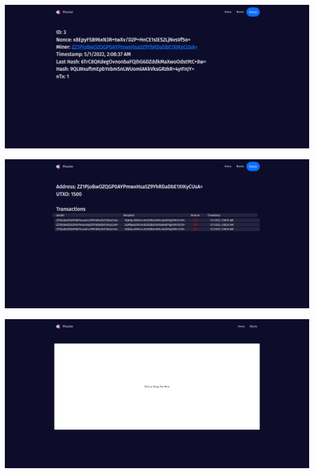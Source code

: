 \documentclass[../documentation.tex]{subfiles}
\begin{document}

\includegraphics[width=\textwidth]{images/website3}


\includegraphics[width=\textwidth]{images/website4}


\includegraphics[width=\textwidth]{images/website5.png}
\end{document}
